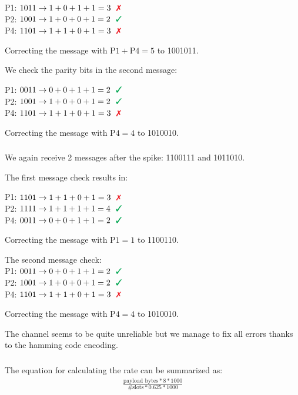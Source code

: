 \documentclass[12pt]{article}
\newcommand{\multipartexercise}{\addtocounter{subsection}{1}\setcounter{subsubsection}{0}}
\newcommand{\exercisepart}{\subsubsection{}}
\begin{document}
\noindent
P1: $1011 \rightarrow 1+0+1+1=3 \ \color{Red} \ \text{\ding{55}}$ \\
P2: $1001 \rightarrow 1+0+0+1=2 \ \color{Green} \ \text{\ding{51}}$ \\
P4: $1101 \rightarrow 1+1+0+1=3 \ \color{Red} \ \text{\ding{55}}$

\noindent
Correcting the message with $\text{P1} + \text{P4} = 5$ to 1001011.

\bigskip
\noindent
We check the parity bits in the second message:

\noindent
P1: $0011 \rightarrow 0+0+1+1=2 \ \color{Green} \ \text{\ding{51}}$ \\
P2: $1001 \rightarrow 1+0+0+1=2 \ \color{Green} \ \text{\ding{51}}$ \\
P4: $1101 \rightarrow 1+1+0+1=3 \ \color{Red} \ \text{\ding{55}}$

\noindent
Correcting the message with $\text{P4} = 4$ to 1010010.

\exercisepart
We again receive 2 messages after the spike: 1100111 and 1011010.

\bigskip
\noindent
The first message check results in:

\noindent
P1: $1101 \rightarrow 1+1+0+1=3 \ \color{Red} \ \text{\ding{55}}$ \\
P2: $1111 \rightarrow 1+1+1+1=4 \ \color{Green} \ \text{\ding{51}}$ \\
P4: $0011 \rightarrow 0+0+1+1=2 \ \color{Green} \ \text{\ding{51}}$

\noindent
Correcting the message with $\text{P1} = 1$ to 1100110.

\bigskip
\noindent
The second message check:
\\
P1: $0011 \rightarrow 0+0+1+1=2 \ \color{Green} \ \text{\ding{51}}$ \\
P2: $1001 \rightarrow 1+0+0+1=2 \ \color{Green} \ \text{\ding{51}}$ \\
P4: $1101 \rightarrow 1+1+0+1=3 \ \color{Red} \ \text{\ding{55}}$

\noindent
Correcting the message with $\text{P4} = 4$ to 1010010.

\bigskip

The channel seems to be quite unreliable but we manage to fix all errors thanks to the hamming code encoding.

\multipartexercise
\exercisepart
The equation for calculating the rate can be summarized as:
\begin{align*}
  \frac{\text{payload bytes}*8*1000}{\text{\#slots}*0.625*1000}
\end{align*}
\end{document}
